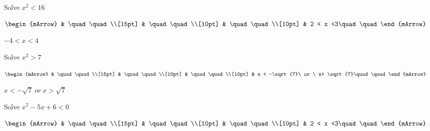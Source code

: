 \begin{mtask}[resume]
\begin{exercise}
\begin{envSolution}
           \end{envSolution}
         \end{exercise}
   \task \begin{exercise} Solve $x^2 < 16$
           \begin{envSolution}
             $\begin{mArrow} 
			       & \quad \quad              \\[15pt]
                   & \quad \quad              \\[10pt]
		   		   & \quad \quad              \\[10pt]
				   & 2 < x <3\quad \quad 
              \end{mArrow}$
            \begin{shortsolution}  
			     $-4 < x < 4$
			\end{shortsolution}				 
           \end{envSolution}
         \end{exercise}
   \task \begin{exercise} Solve $x^2 > 7$
           \begin{envSolution}
             $\begin{mArrow} 
			       & \quad \quad              \\[15pt]
                   & \quad \quad              \\[10pt]
		   		   & \quad \quad              \\[10pt]
				   & x < -\sqrt{7}\ or \ x> \sqrt{7}\quad \quad 
              \end{mArrow}$
            \begin{shortsolution}  
			     $x < -\sqrt{7}\ or \ x> \sqrt{7}$
			\end{shortsolution}				 
           \end{envSolution}
         \end{exercise}
   \task \begin{exercise} Solve $x^2 - 5x + 6 < 0$
           \begin{envSolution}
             $\begin{mArrow} 
			       & \quad \quad              \\[15pt]
                   & \quad \quad              \\[10pt]
		   		   & \quad \quad              \\[10pt]
				   & 2 < x <3\quad \quad 
              \end{mArrow}$
            \begin{shortsolution}  

\end{shortsolution}
\end{envSolution}
\end{exercise}
\end{mtask}
